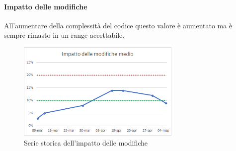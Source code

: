     \paragraph{Impatto delle modifiche} \Spazio
    All'aumentare della complessità del codice questo valore è aumentato ma è sempre rimasto in un range accettabile.
    \begin{figure}[H]
    	\centering 
    	\includegraphics[width=0.7\textwidth]{Images/impatto.png}
    	\caption{Serie storica dell'impatto delle modifiche}
    	\label{modifiche} 
    \end{figure}
